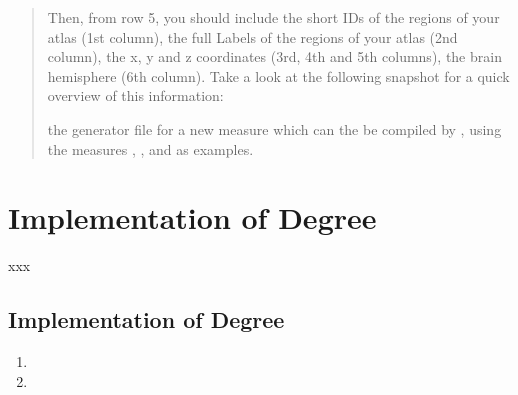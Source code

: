\documentclass{tufte-handout}
\begin{document}
\begin{abstract}
Then, from row 5, you should include the short IDs of the regions of your atlas (1st column), the full Labels of the  regions of your atlas (2nd column), the x, y and z coordinates (3rd, 4th and 5th columns), the brain hemisphere (6th column). Take a look at the following snapshot for a quick overview of this information:







the generator file  for a new measure which can the be compiled by , using the measures , , and  as examples.
\end{abstract}

\tableofcontents

\clearpage
\section{Implementation of Degree}

xxx

\subsection{Implementation of Degree}

\begin{enumerate}
\item
\item
\end{enumerate}

%
%
\end{document}
